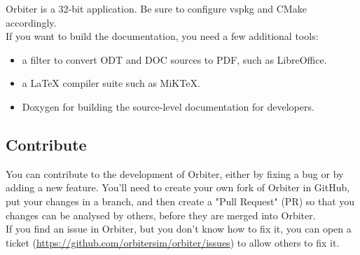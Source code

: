 \documentclass[Orbiter Developer Manual.tex]{subfiles}
\begin{document}
\noindent
Orbiter is a 32-bit application. Be sure to configure vspkg and CMake accordingly.\\
If you want to build the documentation, you need a few additional tools:

\begin{itemize}
\item a filter to convert ODT and DOC sources to PDF, such as LibreOffice.%
\item a LaTeX compiler suite such as MiKTeX.
\item Doxygen for building the source-level documentation for developers.
\end{itemize}


\subsection{Contribute}
You can contribute to the development of Orbiter, either by fixing a bug or by adding a new feature. You'll need to create your own fork of Orbiter in GitHub, put your changes in a branch, and then create a "Pull Request" (PR) so that you changes can be analysed by others, before they are merged into Orbiter.\\
If you find an issue in Orbiter, but you don't know how to fix it, you can open a ticket (\url{https://github.com/orbitersim/orbiter/issues}) to allow others to fix it.
\end{document}
